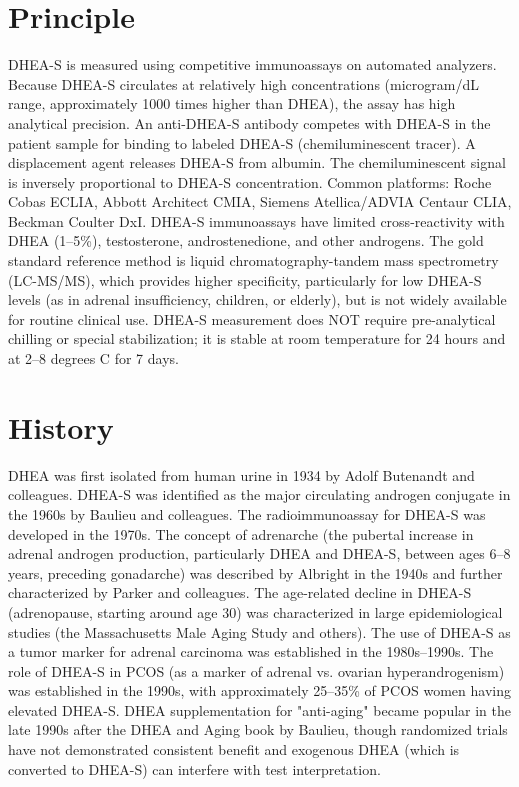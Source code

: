 \section*{Principle}
DHEA-S is measured using competitive immunoassays on automated analyzers. Because DHEA-S circulates at relatively high concentrations (microgram/dL range, approximately 1000 times higher than DHEA), the assay has high analytical precision. An anti-DHEA-S antibody competes with DHEA-S in the patient sample for binding to labeled DHEA-S (chemiluminescent tracer). A displacement agent releases DHEA-S from albumin. The chemiluminescent signal is inversely proportional to DHEA-S concentration. Common platforms: Roche Cobas ECLIA, Abbott Architect CMIA, Siemens Atellica/ADVIA Centaur CLIA, Beckman Coulter DxI. DHEA-S immunoassays have limited cross-reactivity with DHEA (1--5\%), testosterone, androstenedione, and other androgens. The gold standard reference method is liquid chromatography-tandem mass spectrometry (LC-MS/MS), which provides higher specificity, particularly for low DHEA-S levels (as in adrenal insufficiency, children, or elderly), but is not widely available for routine clinical use. DHEA-S measurement does NOT require pre-analytical chilling or special stabilization; it is stable at room temperature for 24 hours and at 2--8 degrees C for 7 days.

\section*{History}
DHEA was first isolated from human urine in 1934 by Adolf Butenandt and colleagues. DHEA-S was identified as the major circulating androgen conjugate in the 1960s by Baulieu and colleagues. The radioimmunoassay for DHEA-S was developed in the 1970s. The concept of adrenarche (the pubertal increase in adrenal androgen production, particularly DHEA and DHEA-S, between ages 6--8 years, preceding gonadarche) was described by Albright in the 1940s and further characterized by Parker and colleagues. The age-related decline in DHEA-S (adrenopause, starting around age 30) was characterized in large epidemiological studies (the Massachusetts Male Aging Study and others). The use of DHEA-S as a tumor marker for adrenal carcinoma was established in the 1980s--1990s. The role of DHEA-S in PCOS (as a marker of adrenal vs. ovarian hyperandrogenism) was established in the 1990s, with approximately 25--35\% of PCOS women having elevated DHEA-S. DHEA supplementation for "anti-aging" became popular in the late 1990s after the DHEA and Aging book by Baulieu, though randomized trials have not demonstrated consistent benefit and exogenous DHEA (which is converted to DHEA-S) can interfere with test interpretation.

